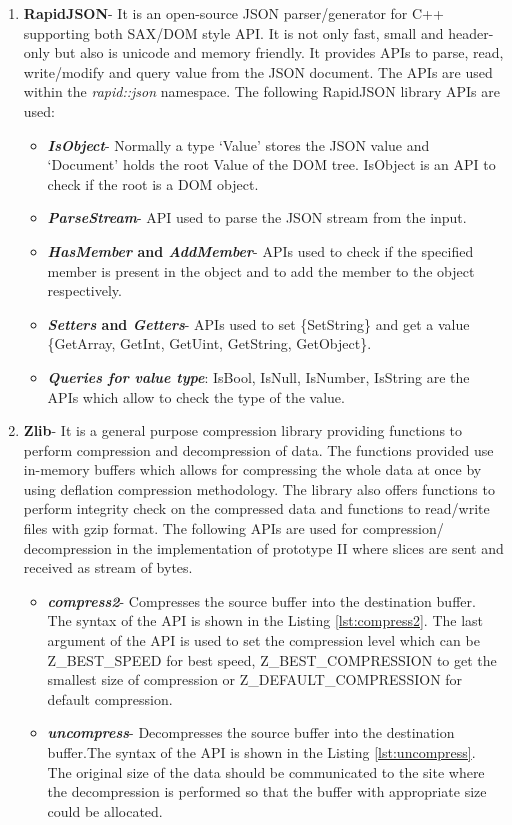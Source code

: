 \begin{enumerate}
\item \textbf{RapidJSON}- It is an open-source JSON parser/generator for C++ supporting both SAX/DOM style API. It is not only fast, small and header-only but also is unicode and memory friendly. It provides APIs to parse, read, write/modify and query value from the JSON document. The APIs are used within the \textit{rapid::json} namespace. The following RapidJSON library APIs are used:
\begin{itemize}
\item \textbf{\textit{IsObject}}- Normally a type {\lq}Value{\rq} stores the JSON value and {\lq}Document{\rq} holds the root Value of the DOM tree. IsObject is an API to check if the root is a DOM object.
\item \textbf{\textit{ParseStream}}- API used to parse the JSON stream from the input.
\item \textbf{\textit{HasMember} and \textit{AddMember}}- APIs used to check if the specified member is present in the object and to add the member to the object respectively. 
\item \textbf{\textit{Setters} and \textit{Getters}}- APIs used to set \{SetString\} and get a value \{GetArray, GetInt, GetUint, GetString, GetObject\}.
\item \textbf{\textit{Queries for value type}}: IsBool, IsNull, IsNumber, IsString are the APIs which allow to check the type of the value. 
\end{itemize} 
  
\item \textbf{Zlib}- It is a general purpose compression library providing functions to perform compression and decompression of data. The functions provided use in-memory buffers which allows for compressing the whole data at once by using deflation compression methodology. The library also offers functions to perform integrity check on the compressed data and functions to read/write files with gzip format. The following APIs are used for compression/ decompression in the implementation of prototype II where slices are sent and received as stream of bytes.  
\begin{itemize}
\item \textbf{\textit{compress2}}- Compresses the source buffer into the destination buffer. The syntax of the API is shown in the Listing \ref{lst:compress2}. The last argument of the API is used to set the compression level which can be Z\_BEST\_SPEED for best speed, Z\_BEST\_COMPRESSION to get the smallest size of compression or Z\_DEFAULT\_COMPRESSION for default compression.
\item \textbf{\textit{uncompress}}- Decompresses the source buffer into the destination buffer.The syntax of the API is shown in the Listing \ref{lst:uncompress}. The original size of the data should be communicated to the site where the decompression is performed so that the buffer with appropriate size could be allocated.
\end{itemize}
\end{enumerate}
   
